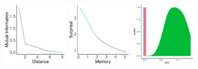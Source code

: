 \documentclass[11pt,letterpaper]{article}
\begin{document}
\begin{figure}
	\begin{center}
		\includegraphics[width=0.3\textwidth]{figures/Japanese-suffixes-byPhonemes-it.pdf}
		\includegraphics[width=0.3\textwidth]{figures/Japanese-suffixes-byPhonemes-memsurp.pdf}
		\includegraphics[width=0.3\textwidth]{figures/Japanese-suffixes-byPhonemes-auc-hist.pdf}


\end{center}
\end{figure}
\end{document}
